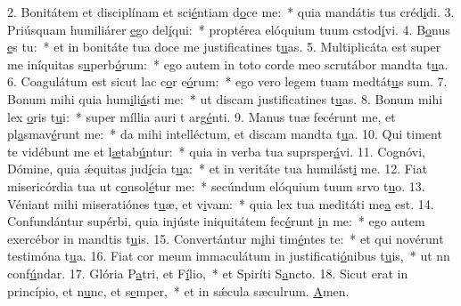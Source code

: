2. Bonitátem et disciplínam et sci\uline{é}ntiam d\uline{o}ce me:~* quia mandátis tus créd\uline{i}di.
3. Priúsquam humiliárer \uline{e}go del\uline{í}qui:~* proptérea elóquium tuum cstod\uline{í}vi.
4. B\uline{o}nus \uline{e}s tu:~* et in bonitáte tua doce me justificatines t\uline{u}as.
5. Multiplicáta est super me iníquitas s\uline{u}perb\uline{ó}rum:~* ego autem in toto corde meo scrutábor mandta t\uline{u}a.
6. Coagulátum est sicut lac c\uline{o}r e\uline{ó}rum:~* ego vero legem tuam medtát\uline{u}s sum.
7. Bonum mihi quia hum\uline{i}li\uline{á}sti me:~* ut discam justificatines t\uline{u}as.
8. Bonum mihi lex \uline{o}ris t\uline{u}i:~* super míllia auri t arg\uline{é}nti.
9. Manus tuæ fecérunt me, et pl\uline{a}smav\uline{é}runt me:~* da mihi intelléctum, et discam mandta t\uline{u}a.
10. Qui timent te vidébunt me et l\uline{æ}tab\uline{ú}ntur:~* quia in verba tua suprsper\uline{á}vi.
11. Cognóvi, Dómine, quia ǽquitas jud\uline{í}cia t\uline{u}a:~* et in veritáte tua humilást\uline{i} me.
12. Fiat misericórdia tua ut c\uline{o}nsol\uline{é}tur me:~* secúndum elóquium tuum srvo t\uline{u}o.
13. Véniant mihi miseratiónes t\uline{u}æ, et v\uline{i}vam:~* quia lex tua meditáti me\uline{a} est.
14. Confundántur supérbi, quia injúste iniquitátem fec\uline{é}runt \uline{i}n me:~* ego autem exercébor in mandtis t\uline{u}is.
15. Convertántur m\uline{i}hi tim\uline{é}ntes te:~* et qui novérunt testimóna t\uline{u}a.
16. Fiat cor meum immaculátum in justificati\uline{ó}nibus t\uline{u}is,~* ut nn conf\uline{ú}ndar.
17. Glória P\uline{a}tri, et F\uline{í}lio,~* et Spiríti S\uline{a}ncto.
18. Sicut erat in princípio, et n\uline{u}nc, et s\uline{e}mper,~* et in sǽcula sæculrum. \uline{A}men.

